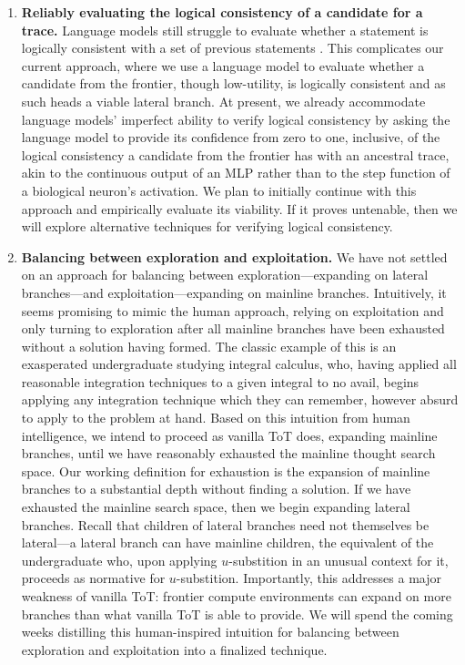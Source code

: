 \documentclass[onecolumn]{IEEEtran}
\begin{document}
\begin{enumerate}
     \item
          \textbf{Reliably evaluating the logical consistency of a candidate for a trace.}
          Language models still struggle to evaluate whether a statement is logically consistent with a set of previous statements \cite{ghosh2025logical,liu2025logicalconsistency,chen2025justlogic,wan2024logicasker}.
          This complicates our current approach, where we use a language model to evaluate whether a candidate from the frontier, though low-utility, is logically consistent and as such heads a viable lateral branch.
          At present, we already accommodate language models' imperfect ability to verify logical consistency by asking the language model to provide its confidence from zero to one, inclusive, of the logical consistency a candidate from the frontier has with an ancestral trace, akin to the continuous output of an MLP rather than to the step function of a biological neuron's activation.
          We plan to initially continue with this approach and empirically evaluate its viability.
          If it proves untenable, then we will explore alternative techniques for verifying logical consistency.
     \item
          \textbf{Balancing between exploration and exploitation.}
          We have not settled on an approach for balancing between exploration---expanding on lateral branches---and exploitation---expanding on mainline branches.
          Intuitively, it seems promising to mimic the human approach, relying on exploitation and only turning to exploration after all mainline branches have been exhausted without a solution having formed.
          The classic example of this is an exasperated undergraduate studying integral calculus, who, having applied all reasonable integration techniques to a given integral to no avail, begins applying any integration technique which they can remember, however absurd to apply to the problem at hand.
          Based on this intuition from human intelligence, we intend to proceed as vanilla ToT does, expanding mainline branches, until we have reasonably exhausted the mainline thought search space.
          Our working definition for exhaustion is the expansion of mainline branches to a substantial depth without finding a solution.
          If we have exhausted the mainline search space, then we begin expanding lateral branches.
          Recall that children of lateral branches need not themselves be lateral---a lateral branch can have mainline children, the equivalent of the undergraduate who, upon applying $u$-substition in an unusual context for it, proceeds as normative for $u$-substition.
          Importantly, this addresses a major weakness of vanilla ToT: frontier compute environments can expand on more branches than what vanilla ToT is able to provide.
          We will spend the coming weeks distilling this human-inspired intuition for balancing between exploration and exploitation into a finalized technique.
\end{enumerate}
\end{document}
